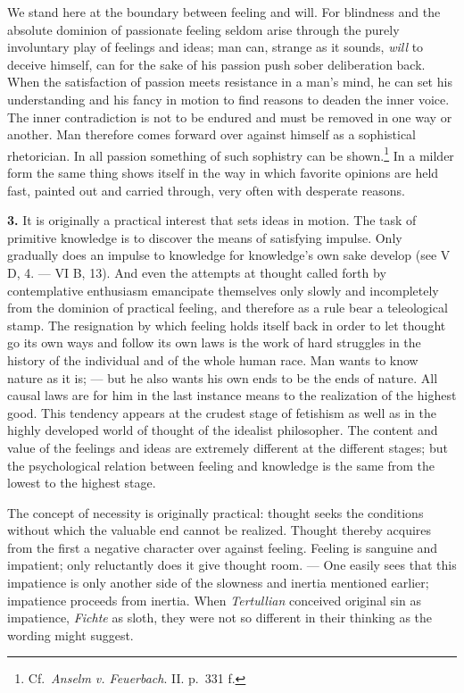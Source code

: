 \documentclass[12pt,a4paper]{book}
\newcommand{\opage}[1]{\marginnote{\footnotesize\textit{[#1]}}}
\begin{document}
We stand here at the boundary between feeling and will. For blindness
and the absolute dominion of passionate feeling seldom arise through the
purely involuntary play of feelings and ideas; man can, strange as it
sounds, \emph{will} to deceive himself, can for the sake of his passion
push sober deliberation back. When the satisfaction of passion meets
resistance in a man's mind, he can set his understanding and his fancy
in motion to find reasons to deaden the inner voice. The inner
contradiction is not to be endured and must be removed in one way or
another. Man therefore comes forward over against himself as a
sophistical rhetorician. In all passion something of such sophistry can
be shown.\footnote{Cf.\ \emph{Anselm v. Feuerbach}. II. p.~331 f.} In a
milder form the same thing shows itself in the way in which favorite
opinions are held fast, painted out and carried through, very often with
desperate reasons.

\textbf{3.} It is originally a practical interest that sets ideas in
motion. The task of primitive knowledge is to discover the means of
satisfying impulse. Only
\opage{356}gradually does an impulse to knowledge for knowledge's own
sake develop (see V D, 4. --- VI B, 13). And even the attempts at
thought called forth by contemplative enthusiasm emancipate themselves
only slowly and incompletely from the dominion of practical feeling, and
therefore as a rule bear a teleological stamp. The resignation by which
feeling holds itself back in order to let thought go its own ways and
follow its own laws is the work of hard struggles in the history of the
individual and of the whole human race. Man wants to know nature as it
is; --- but he also wants his own ends to be the ends of nature. All
causal laws are for him in the last instance means to the realization
of the highest good. This tendency appears at the crudest stage of
fetishism as well as in the highly developed world of thought of the
idealist philosopher. The content and value of the feelings and ideas
are extremely different at the different stages; but the psychological
relation between feeling and knowledge is the same from the lowest to
the highest stage.

The concept of necessity is originally practical: thought seeks the
conditions without which the valuable end cannot be realized. Thought
thereby acquires from the first a negative character over against
feeling. Feeling is sanguine and impatient; only reluctantly does it
give thought room. --- One easily sees that this impatience is only
another side of the slowness and inertia mentioned earlier; impatience
proceeds from inertia. When \emph{Tertullian} conceived original sin as
impatience, \emph{Fichte} as sloth, they were not so different in their
thinking as the wording might suggest.
\end{document}
